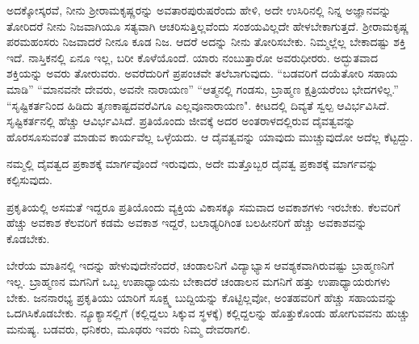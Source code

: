 ಅದಕ್ಕೋಸ್ಕರವೆ, ನೀನು ಶ‍್ರೀರಾಮಕೃಷ್ಣರನ್ನು ಅವತಾರಪುರುಷರೆಂದು ಹೇಳಿ, ಅದೇ ಉಸಿರಿನಲ್ಲಿ ನಿನ್ನ ಅಜ್ಞಾನವನ್ನು ತೋರಿದರೆ ನೀನು ನಿಜವಾಗಿಯೂ ಸತ್ಯವಾಗಿ ಆಚರಿಸುತ್ತಿಲ್ಲವೆಂದು ಸಂಶಯವಿಲ್ಲದೇ ಹೇಳಬೇಕಾಗುತ್ತದೆ. ಶ‍್ರೀರಾಮಕೃಷ್ಣ ಪರಮಹಂಸರು ನಿಜವಾದರೆ ನೀನೂ ಕೂಡ ನಿಜ. ಆದರೆ ಅದನ್ನು ನೀನು ತೋರಿಸಬೇಕು. ನಿಮ್ಮಲ್ಲೆಲ್ಲ ಬೇಕಾದಷ್ಟು ಶಕ್ತಿ ಇದೆ. ನಾಸ್ತಿಕನಲ್ಲಿ ಏನೂ ಇಲ್ಲ, ಬರೀ ಕೊಳೆಯೊಂದೆ. ಯಾರು ನಂಬುತ್ತಾರೋ ಅವರುಧೀರರು. ಅದ್ಭುತವಾದ ಶಕ್ತಿಯನ್ನು ಅವರು ತೋರುವರು. ಅವರೆದುರಿಗೆ ಪ್ರಪಂಚವೇ ತಲೆಬಾಗುವುದು. ``ಬಡವರಿಗೆ ದಯೆತೋರಿ ಸಹಾಯ ಮಾಡಿ” “ಮಾನವನೇ ದೇವರು, ಅವನೇ ನಾರಾಯಣ” “ಆತ್ಮನಲ್ಲಿ ಗಂಡಸು, ಬ್ರಾಹ್ಮಣ ಕ್ಷತ್ರಿಯರೆಂಬ ಭೇದಗಳಿಲ್ಲ.” “ಸೃಷ್ಟಿಕರ್ತನಿಂದ ಹಿಡಿದು ತೃಣಕಾಷ್ಟದವರೆವಿಗೂ ಎಲ್ಲವೂ\break ನಾರಾಯಣ". ಕೀಟದಲ್ಲಿ ದಿವ್ಯತೆ ಸ್ವಲ್ಪ ಆವಿರ್ಭವಿಸಿದೆ. ಸೃಷ್ಟಿಕರ್ತನಲ್ಲಿ ಹೆಚ್ಚು ಆವಿರ್ಭವಿಸಿದೆ. ಪ್ರತಿಯೊಂದು ಜೀವಕ್ಕೆ ಅದರ ಅಂತರಾಳದಲ್ಲಿರುವ ದೈವತ್ವವನ್ನು ಹೊರಸೂಸುವಂತೆ ಮಾಡುವ ಕಾರ್ಯವೆಲ್ಲ ಒಳ್ಳೆಯದು. ಆ ದೈವತ್ವವನ್ನು ಯಾವುದು ಮುಚ್ಚುವುದೋ ಅದೆಲ್ಲ ಕೆಟ್ಟದ್ದು.

ನಮ್ಮಲ್ಲಿ ದೈವತ್ವದ ಪ್ರಕಾಶಕ್ಕೆ ಮಾರ್ಗವೊಂದೆ ಇರುವುದು, ಅದೇ ಮತ್ತೊಬ್ಬರ ದೈವತ್ವ ಪ್ರಕಾಶಕ್ಕೆ ಮಾರ್ಗವನ್ನು ಕಲ್ಪಿಸುವುದು.

ಪ್ರಕೃತಿಯಲ್ಲಿ ಅಸಮತೆ ಇದ್ದರೂ ಪ್ರತಿಯೊಂದು ವ್ಯಕ್ತಿಯ ವಿಕಾಸಕ್ಕೂ ಸಮವಾದ ಅವಕಾಶಗಳು ಇರಬೇಕು. ಕೆಲವರಿಗೆ ಹೆಚ್ಚು ಅವಕಾಶ ಕೆಲವರಿಗೆ ಕಡಮೆ ಅವಕಾಶ ಇದ್ದರೆ, ಬಲಾಢ್ಯರಿಗಿಂತ ಬಲಹೀನರಿಗೆ ಹೆಚ್ಚು ಅವಕಾಶವನ್ನು ಕೊಡಬೇಕು.

ಬೇರೆಯ ಮಾತಿನಲ್ಲಿ ಇದನ್ನು ಹೇಳುವುದೇನೆಂದರೆ, ಚಂಡಾಲನಿಗೆ ವಿದ್ಯಾಭ್ಯಾಸ ಆವಶ್ಯಕವಾಗಿರುವಷ್ಟು ಬ್ರಾಹ್ಮಣನಿಗೆ ಇಲ್ಲ. ಬ್ರಾಹ್ಮಣನ ಮಗನಿಗೆ ಒಬ್ಬ ಉಪಾಧ್ಯಾಯನು ಬೇಕಾದರೆ ಚಂಡಾಲನ ಮಗನಿಗೆ ಹತ್ತು ಉಪಾಧ್ಯಾಯರುಗಳು ಬೇಕು. ಜನನಾರಭ್ಯ ಪ್ರಕೃತಿಯು ಯಾರಿಗೆ ಸೂಕ್ಷ್ಮ ಬುದ್ದಿಯನ್ನು ಕೊಟ್ಟಿಲ್ಲವೋ, ಅಂತಹವರಿಗೆ ಹೆಚ್ಚು ಸಹಾಯವನ್ನು ಒದಗಿಸಿಕೊಡಬೇಕು. ನ್ಯೂಕ್ಯಾಸಲ್ಲಿಗೆ (ಕಲ್ಲಿದ್ದಲು ಸಿಕ್ಕುವ ಸ್ಥಳಕ್ಕೆ) ಕಲ್ಲಿದ್ದಲನ್ನು ಹೊತ್ತುಕೊಂಡು ಹೋಗುವವನು ಹುಚ್ಚು ಮನುಷ್ಯ. ಬಡವರು, ಧನಿಕರು, ಮೂಢರು ಇವರು ನಿಮ್ಮ ದೇವರಾಗಲಿ.

